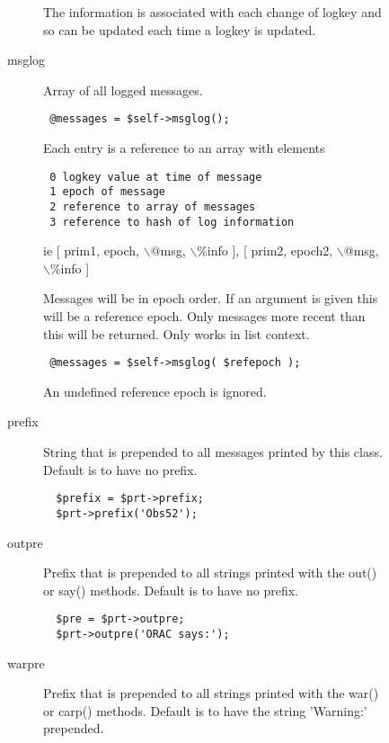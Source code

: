 \begin{description}
\begin{description}
\begin{description}
The information is associated with each change of logkey and so can be
updated each time a logkey is updated.


\item[{msglog}] \mbox{}

Array of all logged messages.

\begin{verbatim}
 @messages = $self->msglog();
\end{verbatim}


Each entry is a reference to an array with elements

\begin{verbatim}
 0 logkey value at time of message
 1 epoch of message
 2 reference to array of messages
 3 reference to hash of log information
\end{verbatim}


ie [ prim1, epoch, $\backslash$@msg, $\backslash$\%info ], [ prim2, epoch2, $\backslash$@msg, $\backslash$\%info ]



Messages will be in epoch order. If an argument is given
this will be a reference epoch. Only messages more recent
than this will be returned. Only works in list context.

\begin{verbatim}
 @messages = $self->msglog( $refepoch );
\end{verbatim}


An undefined reference epoch is ignored.


\item[{prefix}] \mbox{}

String that is prepended to all messages printed by this class.
Default is to have no prefix.

\begin{verbatim}
  $prefix = $prt->prefix;
  $prt->prefix('Obs52');
\end{verbatim}

\item[{outpre}] \mbox{}

Prefix that is prepended to all strings printed with the
out() or say() methods. Default is to have no prefix.

\begin{verbatim}
  $pre = $prt->outpre;
  $prt->outpre('ORAC says:');
\end{verbatim}

\item[{warpre}] \mbox{}

Prefix that is prepended to all strings printed with the
war() or carp() methods. Default is to have the string 'Warning:' prepended.


\end{description}
\end{description}
\end{description}
